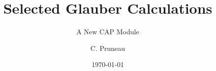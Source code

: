 \documentclass{beamer}
\title{Selected Glauber Calculations}
\subtitle{A New CAP Module}
\author{C. Pruneau}
\institute{Wayne State University}
\date{\today}
\begin{document}
\begin{frame}
\titlepage
\end{frame}
\end{document}
